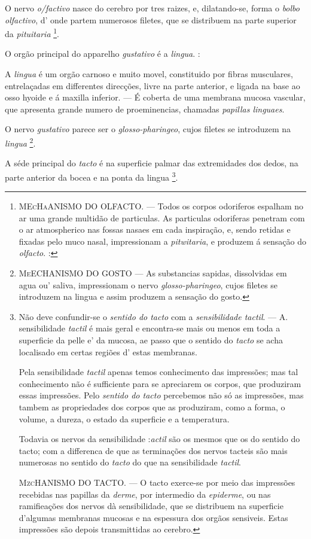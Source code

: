 O nervo \emph{o/factivo} nasce do cerebro por tres raizes, e, dilatando-se, forma o \emph{bolbo olfactivo}, d' onde partem numerosos filetes, que se distribuem na parte superior da \emph{pituitaria} \footnote{\textsc{MEcHaANISMO} DO OLFACTO. --- Todos os corpos odoriferos espalham no ar uma grande multidão de particulas. As particulas odoriferas penetram com o ar atmospherico nas fossas nasaes em cada inspiração, e, sendo retidas e fixadas pelo muco nasal, impressionam a \emph{pitwitaria}, e produzem á sensação do \emph{olfacto}. :}.


O orgão principal do apparelho \emph{gustativo} é a \emph{lingua}. :

A \emph{lingua} é um orgão carnoso e muito movel, constituido por fibras musculares, entrelaçadas em differentes direcções, livre na parte anterior, e ligada na base ao osso hyoide e á   maxilla inferior. --- É coberta de uma membrana mucosa vascular, que apresenta grande numero de proeminencias, chamadas \emph{papillas linguaes}.

O nervo \emph{gustativo} parece ser o \emph{glosso-pharingeo}, cujos filetes se introduzem na \emph{lingua} \footnote{\textsc{MeECHANISMO} DO GOSTO --- As substancias sapidas, dissolvidas em agua ou' saliva, impressionam o nervo \emph{glosso-pharingeo}, cujos filetes se introduzem na lingua e assim produzem a sensação do gosto.}.


A séde principal do \emph{tacto} é na superficie palmar das extremidades dos dedos, na parte anterior da bocea e na ponta da lingua \footnote{Não deve confundir-se o \emph{sentido do tacto} com a \emph{sensibilidade tactil}. --- A. sensibilidade \emph{tactil} é mais geral e encontra-se mais ou menos em toda a superficie da pelle e' da mucosa, ae passo que o sentido do \emph{tacto} se acha localisado em certas regiões d' estas membranas.\par Pela sensibilidade \emph{tactil} apenas temos conhecimento das impressões; mas tal conhecimento não é sufficiente para se apreciarem os corpos, que produziram essas impressões. Pelo \emph{sentido do tacto} percebemos não só as impressões, mas tambem as propriedades dos corpos que as produziram, como a forma, o volume, a dureza, o estado da superficie e a temperatura.\par Todavia os nervos da sensibilidade :\emph{actil} são os mesmos que os do sentido do tacto; com a differenca de que as terminações dos nervos tacteis são mais numerosas no sentido do \emph{tacto} do que na sensibilidade \emph{tactil}.\par \textsc{MzcHANISMO} DO TACTO. --- O tacto exerce-se por meio das impressões recebidas nas papillas da \emph{derme}, por intermedio da \emph{epiderme}, ou nas ramifieações dos nervos dà sensibilidade, que se distribuem na superficie d'algumas membranas mucosas e na espessura dos orgãos sensiveis. Estas impressões são depois transmittidas ao cerebro.}.


